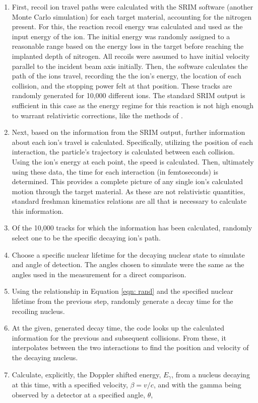 \begin{enumerate}
\item First, recoil ion travel paths were calculated with the SRIM software \cite{Ziegler2010} (another Monte Carlo simulation) for each target material, accounting for the nitrogen present. For this, the reaction recoil energy was calculated and used as the input energy of the ion. The initial energy was randomly assigned to a reasonable range based on the energy loss in the target before reaching the implanted depth of nitrogen. All recoils were assumed to have initial velocity parallel to the incident beam axis initially. Then, the software calculates the path of the ions travel, recording the the ion's energy, the location of each collision, and the stopping power felt at that position. These tracks are randomly generated for 10,000 different ions. The standard SRIM output is sufficient in this case as the energy regime for this reaction is not high enough to warrant relativistic corrections, like the methods of \cite{Galinski2014, Michelagnoli2013}. 
\item Next, based on the information from the SRIM output, further information about each ion's travel is calculated. Specifically, utilizing the position of each interaction, the particle's trajectory is calculated between each collision. Using the ion's energy at each point, the speed is calculated. Then, ultimately using these data, the time for each interaction (in femtoseconds) is determined. This provides a complete picture of any single ion's calculated motion through the target material. As these are not relativistic quantities, standard freshman kinematics relations are all that is necessary to calculate this information.
\item Of the 10,000 tracks for which the information has been calculated, randomly select one to be the specific decaying ion's path. 
\item Choose a specific nuclear lifetime for the decaying nuclear state to simulate and angle of detection. The angles chosen to simulate were the same as the angles used in the measurement for a direct comparison. 
\item Using the relationship in Equation \ref{eqn: rand} and the specified nuclear lifetime from the previous step, randomly generate a decay time for the recoiling nucleus.  
\item At the given, generated decay time, the code looks up the calculated information for the previous and subsequent collisions. From these, it interpolates between the two interactions to find the position and velocity of the decaying nucleus. 
\item Calculate, explicitly, the Doppler shifted energy, $E_{\gamma}$, from a nucleus decaying at this time, with a specified velocity, $\beta = v/c$, and with the gamma being observed by a detector at a specified angle, $\theta$,


\end{enumerate}
